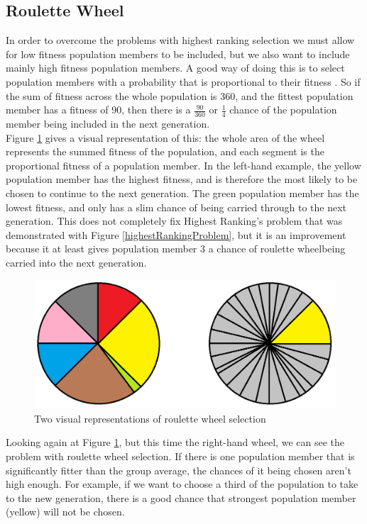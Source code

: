 \documentclass[]{report}
\begin{document}
\subsection{Roulette Wheel}

In order to overcome the problems with highest ranking selection we must allow for low fitness population members to be included, but we also want to include mainly high fitness population members. A good way of doing this is to select population members with a probability that is proportional to their fitness \cite{MitchelGA}. So if the sum of fitness across the whole population is 360, and the fittest population member has a fitness of 90, then there is a $\frac{90}{360}$ or $\frac{1}{4}$ chance of the population member being included in the next generation.\\

Figure \ref{rouletteWheel} gives a visual representation of this: the whole area of the wheel represents the summed fitness of the population, and each segment is the proportional fitness of a population member. In the left-hand example, the yellow population member has the highest fitness, and is therefore the most likely to be chosen to continue to the next generation. The green population member has the lowest fitness, and only has a slim chance of being carried through to the next generation. This does not completely fix Highest Ranking's problem that was demonstrated with Figure \ref{highestRankingProblem}, but it is an improvement because it at least gives population member 3 a chance of roulette wheelbeing carried into the next generation.\\

\begin{figure}
	\centering
	\includegraphics[scale=0.4]{figures/rouletteWheel.png}
	\caption{Two visual representations of roulette wheel selection}
	\label{rouletteWheel}
\end{figure}

Looking again at Figure \ref{rouletteWheel}, but this time the right-hand wheel, we can see the problem with roulette wheel selection. If there is one population member that is significantly fitter than the group average, the chances of it being chosen aren't high enough. For example, if we want to choose a third of the population to take to the new generation, there is a good chance that strongest population member (yellow) will not be chosen.
\end{document}
